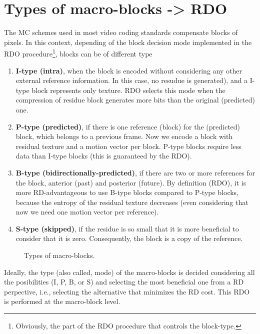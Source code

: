 

\section{Types of macro-blocks -> RDO}

The MC schemes used in most video coding standards compensate blocks
of pixels. In this context, depending of the block
decision mode implemented in the RDO procedure\footnote{Obviously, the
  part of the RDO procedure that controls the block-type.}, blocks can
be of different type~\cite{vruiz__MEC}
\begin{enumerate}
\item \textbf{I-type (intra)}, when the block is encoded without
  considering any other external reference information. In this case,
  no resudue is generated), and a I-type block represents only
  texture. RDO selects this mode when the compression of residue block
  generates more bits than the original (predicted) one.
\item \textbf{P-type (predicted)}, if there is one reference (block)
  for the (predicted) block, which belongs to a previous frame. Now we
  encode a block with residual texture and a motion vector per
  block. P-type blocks require less data than I-type blocks (this is
  guaranteed by the RDO).
\item \textbf{B-type (bidirectionally-predicted)}, if there are two or
  more references for the block, anterior (past) and posterior
  (future). By definition (RDO), it is more RD-advantageous to use
  B-type blocks compared to P-type blocks, because the entropy of the
  residual texture decreases (even considering that now we need one
  motion vector per reference).
\item \textbf{S-type (skipped)}, if the residue is so small that it is
  more beneficial to consider that it is zero. Consequently, the block
  is a copy of the reference.
\end{enumerate}

\begin{figure}
  \centering
  \caption{Types of macro-blocks.}
  \label{fig:macroblocks}
\end{figure}

Ideally, the type (also called, mode) of the macro-blocks is decided
considering all the posibilities (I, P, B, or S) and selecting the
most beneficial one from a RD perpective, i.e., selecting the
alternative that minimizes the RD cost. This RDO is performed at the
macro-block level.


